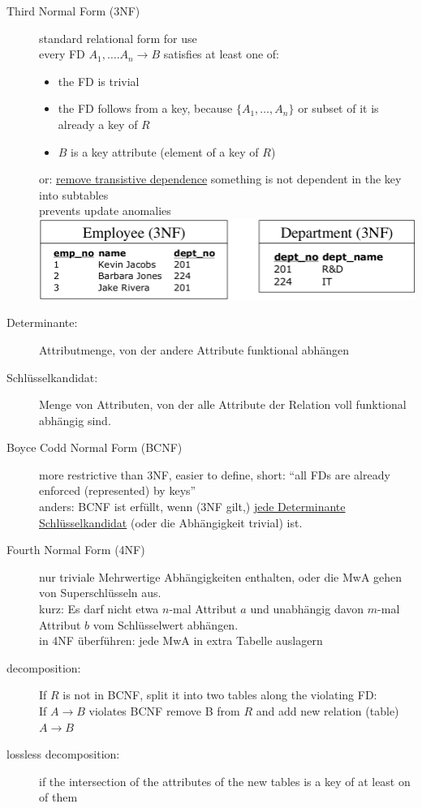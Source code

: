 \documentclass{scrartcl}
\begin{document}
\begin{description}
	\item[Third Normal Form (3NF)] standard relational form for use\\
	every FD $A_1,\dots.A_n\to B$ satisfies at least one of:
	\begin{itemize}
		\item the FD is trivial
		\item the FD follows from a key, because $\{A_1,\dots,A_n\}$ or subset of it is already a key of $R$
		\item $B$ is a key attribute (element of a key of $R$)
	\end{itemize}
	or: \underline{remove transistive dependence} {\tiny something is not dependent in the key} into subtables\\
	prevents update anomalies\\
	\includegraphics[scale=0.4]{3NF.png}
	\item[Determinante:] Attributmenge, von der andere Attribute funktional abhängen
	\item[Schlüsselkandidat:] Menge von Attributen, von der alle Attribute der Relation voll funktional abhängig sind.
	\item[Boyce Codd Normal Form (BCNF)] more restrictive than 3NF, easier to define, short: "`all FDs are already enforced (represented) by keys"'\\
	anders: BCNF ist erfüllt, wenn (3NF gilt,) \underline{jede Determinante Schlüsselkandidat} (oder die Abhängigkeit trivial) ist. 
	\item[Fourth Normal Form (4NF)] nur triviale Mehrwertige Abhängigkeiten enthalten, oder die MwA gehen von Superschlüsseln aus. \\
	kurz: Es darf nicht etwa $n$-mal Attribut $a$ und unabhängig davon $m$-mal Attribut $b$ vom Schlüsselwert abhängen.\\
	in 4NF überführen: jede MwA in extra Tabelle auslagern
	\item[decomposition:] If $R$ is not in BCNF, split it into two tables along the violating FD: \\
	If $A\to B$ violates BCNF remove B from $R$ and add new relation (table) $A\to B$
	\item[lossless decomposition:] if the intersection of the attributes of the new tables is a key of at least on of them \\

\end{description}
\end{document}
